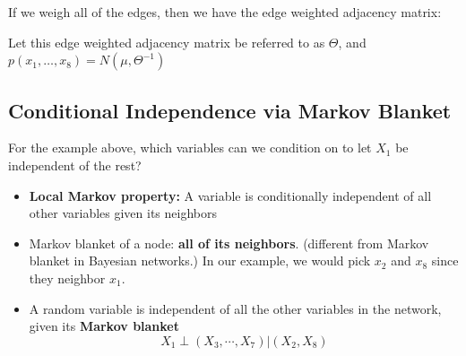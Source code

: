 \documentclass[10pt]{article}
\begin{document}
If we weigh all of the edges, then we have the edge weighted adjacency matrix:
\begin{center}
\end{center}
Let this edge weighted adjacency matrix be referred to as $\Theta$, and $p(x_1, \dots, x_8) = N(\mu, \Theta^{-1})$

\subsection*{Conditional Independence via Markov Blanket}
For the example above, which variables can we condition on to let $X_1$ be independent of the rest?
\begin{itemize}
	\item \textbf{Local Markov property:} A variable is conditionally independent of all other variables given its neighbors
	\item Markov blanket of a node: \textbf{all of its neighbors}.  (different from Markov blanket in Bayesian networks.)  In our example, we would pick $x_2$ and $x_8$ since they neighbor $x_1$.
	\item A random variable is independent of all the other variables in the network, given its \textbf{Markov blanket}
	\[X_1 \perp (X_3, \cdots, X_7) | (X_2, X_8)\]
\end{itemize}
\end{document}
